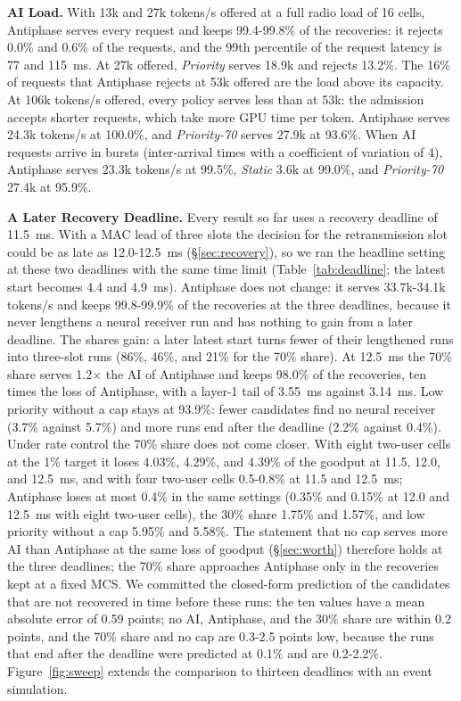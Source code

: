 \documentclass[acmsmall,screen,review,anonymous]{acmart}
\newcommand{\sys}{Antiphase\xspace}
\begin{document}
\noindent\textbf{AI Load.} With 13k and 27k tokens/s offered at a full radio load of 16 cells, \sys serves
every request and keeps 99.4-99.8\% of the recoveries: it rejects 0.0\% and 0.6\% of the requests, and the
99th percentile of the request latency is 77 and 115~ms. At 27k offered, \textit{Priority} serves 18.9k and
rejects 13.2\%. The 16\% of requests that \sys rejects at 53k offered are the load above its capacity. At 106k tokens/s offered, every policy serves less
than at 53k: the admission accepts shorter requests, which take more GPU time per token. \sys serves 24.3k
tokens/s at 100.0\%, and \textit{Priority-70} serves 27.9k at 93.6\%. When AI requests arrive
in bursts (inter-arrival times with a coefficient of variation of 4), \sys serves 23.3k tokens/s at 99.5\%,
\textit{Static} 3.6k at 99.0\%, and \textit{Priority-70} 27.4k at 95.9\%.

\noindent\textbf{A Later Recovery Deadline.} Every result so far uses a recovery deadline of 11.5~ms. With a
MAC lead of three slots the decision for the retransmission slot could be as late as 12.0-12.5~ms
(\S\ref{sec:recovery}), so we ran the headline setting at these two deadlines with the same time limit
(Table~\ref{tab:deadline}; the latest start becomes 4.4 and 4.9~ms). \sys does not change: it serves
33.7k-34.1k tokens/s and keeps 99.8-99.9\% of the recoveries at the three deadlines, because it never
lengthens a neural receiver run and has nothing to gain from a later deadline. The shares gain: a later
latest start turns fewer of their lengthened runs into three-slot runs (86\%, 46\%, and 21\% for the 70\%
share). At 12.5~ms the 70\% share serves 1.2$\times$ the AI of \sys and keeps 98.0\% of the recoveries, ten
times the loss of \sys, with a layer-1 tail of 3.55~ms against 3.14~ms. Low priority without a cap stays at
93.9\%: fewer candidates find no neural receiver (3.7\% against 5.7\%) and more runs end after the deadline
(2.2\% against 0.4\%). Under rate control the 70\% share does not come closer. With eight two-user cells at
the 1\% target it loses 4.03\%, 4.29\%, and 4.39\% of the goodput at 11.5, 12.0, and 12.5~ms, and with four
two-user cells 0.5-0.8\% at 11.5 and 12.5~ms; \sys loses at most 0.4\% in the same settings (0.35\% and
0.15\% at 12.0 and 12.5~ms with eight two-user cells), the 30\% share 1.75\% and 1.57\%,
and low priority without a cap 5.95\% and 5.58\%. The statement that no cap serves more AI than \sys at
the same loss of goodput (\S\ref{sec:worth}) therefore holds at the three deadlines; the 70\% share
approaches \sys only in the recoveries kept at a fixed MCS. We committed the closed-form prediction of the candidates
that are not recovered in time before these runs: the ten values have a mean absolute error of 0.59 points;
no AI, \sys, and the 30\% share are within 0.2 points, and the 70\% share and no cap are 0.3-2.5 points
low, because the runs that end after the deadline were predicted at 0.1\% and are 0.2-2.2\%.
Figure~\ref{fig:sweep} extends the comparison to thirteen deadlines with an event simulation.
\end{document}
